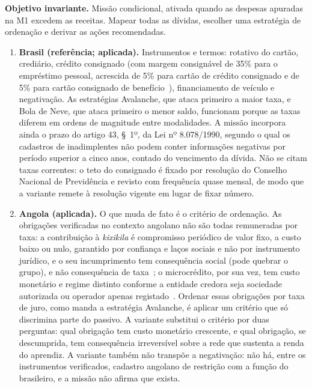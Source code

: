\noindent\textbf{Objetivo invariante.} Missão condicional, ativada quando as despesas apuradas na M1 excedem as receitas. Mapear todas as dívidas, escolher uma estratégia de ordenação e derivar as ações recomendadas.

\begin{enumerate}
\item[(a)] \textbf{Brasil (referência; aplicada).} Instrumentos e termos: rotativo do cartão, crediário, crédito consignado (com margem consignável de 35\% para o empréstimo pessoal, acrescida de 5\% para cartão de crédito consignado e de 5\% para cartão consignado de benefício~\cite{previdencia2025consignado}), financiamento de veículo e negativação. As estratégias Avalanche, que ataca primeiro a maior taxa, e Bola de Neve, que ataca primeiro o menor saldo, funcionam porque as taxas diferem em ordens de magnitude entre modalidades. A missão incorpora ainda o prazo do artigo 43, §~1º, da Lei nº 8.078/1990, segundo o qual os cadastros de inadimplentes não podem conter informações negativas por período superior a cinco anos, contado do vencimento da dívida. Não se citam taxas correntes: o teto do consignado é fixado por resolução do Conselho Nacional de Previdência e revisto com frequência quase mensal, de modo que a variante remete à resolução vigente em lugar de fixar número.

\item[(b)] \textbf{Angola (aplicada).} O que muda de fato é o critério de ordenação. As obrigações verificadas no contexto angolano não são todas remuneradas por taxa: a contribuição à \textit{kixikila} é compromisso periódico de valor fixo, a custo baixo ou nulo, garantido por confiança e laços sociais e não por instrumento jurídico, e o seu incumprimento tem consequência social (pode quebrar o grupo), e não consequência de taxa~\cite{carlos2014kixikila}; o microcrédito, por sua vez, tem custo monetário e regime distinto conforme a entidade credora seja sociedade autorizada ou operador apenas registado~\cite{bna_microcredito}. Ordenar essas obrigações por taxa de juro, como manda a estratégia Avalanche, é aplicar um critério que só discrimina parte do passivo. A variante substitui o critério por duas perguntas: qual obrigação tem custo monetário crescente, e qual obrigação, se descumprida, tem consequência irreversível sobre a rede que sustenta a renda do aprendiz. A variante também não transpõe a negativação: não há, entre os instrumentos verificados, cadastro angolano de restrição com a função do brasileiro, e a missão não afirma que exista.


\end{enumerate}
